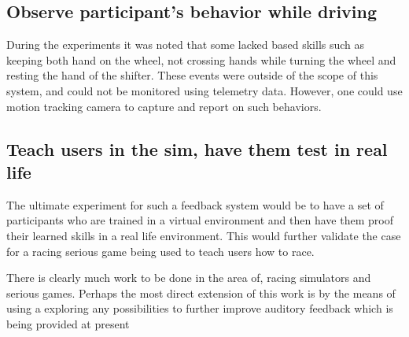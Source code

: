 \subsection{Observe participant’s behavior while driving}
During the experiments it was noted that some lacked based skills such as keeping both hand on the wheel, not crossing hands while turning the wheel and resting the hand of the shifter. These events were outside of the scope of this system, and could not be monitored using telemetry data. However, one could use motion tracking camera to capture and report on such behaviors. 

\subsection{Teach users in the sim, have them test in real life}
The ultimate experiment for such a feedback system would be to have a set of participants who are trained in a virtual environment and then have them proof their learned skills in a real life environment. This would further validate the case for a racing serious game being used to teach users how to race.

There is clearly much work to be done in the area of, racing simulators and serious games. Perhaps the most direct extension of this work is by the means of using
a exploring any possibilities to further improve auditory feedback which is being provided at present 
